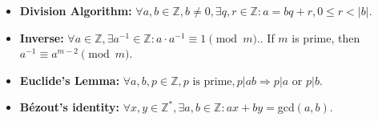 \begin{itemize}
    \item \textbf{Division Algorithm: }$\forall a,b \in \mathbb{Z}, b \neq 0, \exists q,r \in \mathbb{Z} : a = bq + r, 0 \leq r < |b|$.
    \item \textbf{Inverse: }$\forall a \in \mathbb{Z}, \exists a^{-1} \in \mathbb{Z} : a \cdot a^{-1} \equiv 1 \pmod{m}.$. If $m$ is prime, then $a^{-1} \equiv a^{m-2} \pmod{m}$.
    \item \textbf{Euclide's Lemma: }$\forall a,b,p \in \mathbb{Z}, p \text{ is prime}, p|ab \Rightarrow p|a \text{ or } p|b$.
    \item \textbf{Bézout's identity: }$\forall x,y \in \mathbb{Z}^*, \exists a,b \in \mathbb{Z} : ax + by = $gcd$(a,b)$.
\end{itemize}